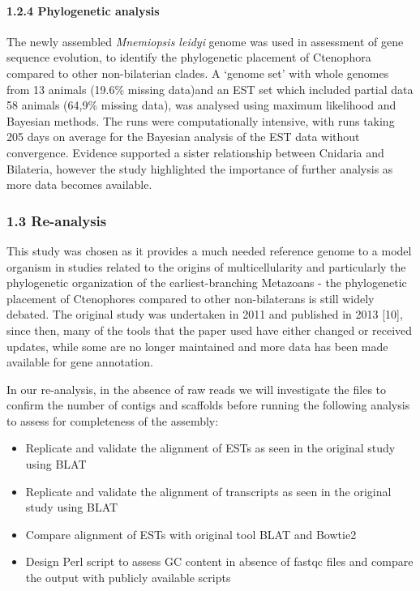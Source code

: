 \documentclass[
]{article}
\providecommand{\tightlist}{%
  \setlength{\itemsep}{0pt}\setlength{\parskip}{0pt}}
\begin{document}
\hypertarget{phylogenetic-analysis}{%
\paragraph{1.2.4 Phylogenetic analysis}\label{phylogenetic-analysis}}

The newly assembled \emph{Mnemiopsis leidyi} genome was used in
assessment of gene sequence evolution, to identify the phylogenetic
placement of Ctenophora compared to other non-bilaterian clades. A
`genome set' with whole genomes from 13 animals (19.6\% missing data)and
an EST set which included partial data 58 animals (64,9\% missing data),
was analysed using maximum likelihood and Bayesian methods. The runs
were computationally intensive, with runs taking 205 days on average for
the Bayesian analysis of the EST data without convergence. Evidence
supported a sister relationship between Cnidaria and Bilateria, however
the study highlighted the importance of further analysis as more data
becomes available.

\hypertarget{re-analysis}{%
\subsubsection{1.3 Re-analysis}\label{re-analysis}}

This study was chosen as it provides a much needed reference genome to a
model organism in studies related to the origins of multicellularity and
particularly the phylogenetic organization of the earliest-branching
Metazoans - the phylogenetic placement of Ctenophores compared to other
non-bilaterans is still widely debated. The original study was
undertaken in 2011 and published in 2013 {[}10{]}, since then, many of
the tools that the paper used have either changed or received updates,
while some are no longer maintained and more data has been made
available for gene annotation.

In our re-analysis, in the absence of raw reads we will investigate the
files to confirm the number of contigs and scaffolds before running the
following analysis to assess for completeness of the assembly:

\begin{itemize}
\tightlist
\item
  Replicate and validate the alignment of ESTs as seen in the original
  study using BLAT
\item
  Replicate and validate the alignment of transcripts as seen in the
  original study using BLAT
\item
  Compare alignment of ESTs with original tool BLAT and Bowtie2
\item
  Design Perl script to assess GC content in absence of fastqc files and
  compare the output with publicly available scripts
\end{itemize}
\end{document}
